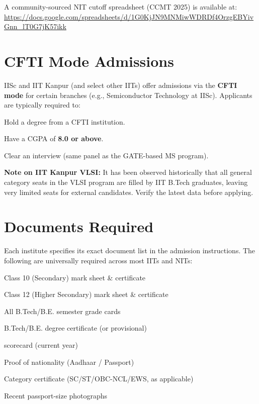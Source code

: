 \begin{protip}
  A community-sourced NIT cutoff spreadsheet (CCMT 2025) is available at:\\
  \url{https://docs.google.com/spreadsheets/d/1G0KjJN9MNMiwWDRDf4OrzgEBYivGnn\_lT0G7jK57ikk}
\end{protip}

\section{CFTI Mode Admissions}
\label{sec:cfti}

\begin{eligalert}
  IISc and IIT Kanpur (and select other IITs) offer admissions via the
  \textbf{CFTI mode} for certain branches (e.g., Semiconductor Technology at
  IISc). Applicants are typically required to:
  \begin{pfChecklist}
    \item Hold a degree from a CFTI institution.
    \item Have a CGPA of \textbf{8.0 or above}.
    \item Clear an interview (same panel as the GATE-based MS program).
  \end{pfChecklist}
\end{eligalert}

\noindent\textbf{Note on IIT Kanpur VLSI:} It has been observed historically that
all general category seats in the VLSI program are filled by IIT B.Tech graduates,
leaving very limited seats for external \GATE candidates. Verify the latest data
before applying.

\section{Documents Required}
\label{sec:documents}

Each institute specifies its exact document list in the admission instructions.
The following are universally required across most IITs and NITs:

\begin{pfChecklist}
  \item Class 10 (Secondary) mark sheet \& certificate
  \item Class 12 (Higher Secondary) mark sheet \& certificate
  \item All B.Tech/B.E. semester grade cards
  \item B.Tech/B.E. degree certificate (or provisional)
  \item \GATE scorecard (current year)
  \item Proof of nationality (Aadhaar / Passport)
  \item Category certificate (SC/ST/OBC-NCL/EWS, as applicable)
  \item Recent passport-size photographs
\end{pfChecklist}

